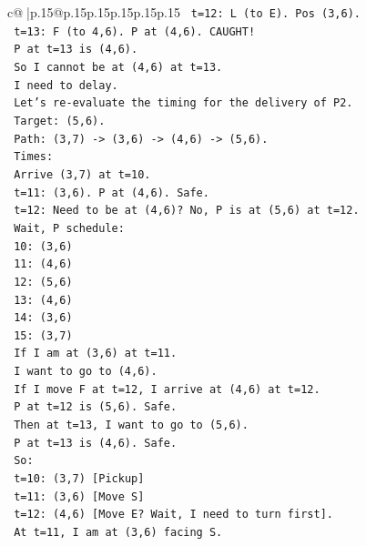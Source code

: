 \documentclass{article}
\begin{document}
{\begin{supertabular}{c@{$\;$}|p{.15\linewidth}@{}p{.15\linewidth}p{.15\linewidth}p{.15\linewidth}p{.15\linewidth}p{.15\linewidth}}
{{{\texttt{          t=12: L (to E). Pos (3,6).} \\
\texttt{          t=13: F (to 4,6). P at (4,6). CAUGHT!} \\
\texttt{          P at t=13 is (4,6).} \\
\texttt{          So I cannot be at (4,6) at t=13.} \\
\texttt{          I need to delay.} \\
\texttt{          Let's re{-}evaluate the timing for the delivery of P2.} \\
\texttt{          Target: (5,6).} \\
\texttt{          Path: (3,7) {-}> (3,6) {-}> (4,6) {-}> (5,6).} \\
\texttt{          Times:} \\
\texttt{          Arrive (3,7) at t=10.} \\
\texttt{          t=11: (3,6). P at (4,6). Safe.} \\
\texttt{          t=12: Need to be at (4,6)? No, P is at (5,6) at t=12.} \\
\texttt{          Wait, P schedule:} \\
\texttt{          10: (3,6)} \\
\texttt{          11: (4,6)} \\
\texttt{          12: (5,6)} \\
\texttt{          13: (4,6)} \\
\texttt{          14: (3,6)} \\
\texttt{          15: (3,7)} \\
\texttt{          If I am at (3,6) at t=11.} \\
\texttt{          I want to go to (4,6).} \\
\texttt{          If I move F at t=12, I arrive at (4,6) at t=12.} \\
\texttt{          P at t=12 is (5,6). Safe.} \\
\texttt{          Then at t=13, I want to go to (5,6).} \\
\texttt{          P at t=13 is (4,6). Safe.} \\
\texttt{          So:} \\
\texttt{          t=10: (3,7) {[}Pickup{]}} \\
\texttt{          t=11: (3,6) {[}Move S{]}} \\
\texttt{          t=12: (4,6) {[}Move E? Wait, I need to turn first{]}.} \\
\texttt{          At t=11, I am at (3,6) facing S.} \\
}}}
\end{supertabular}}
\end{document}
